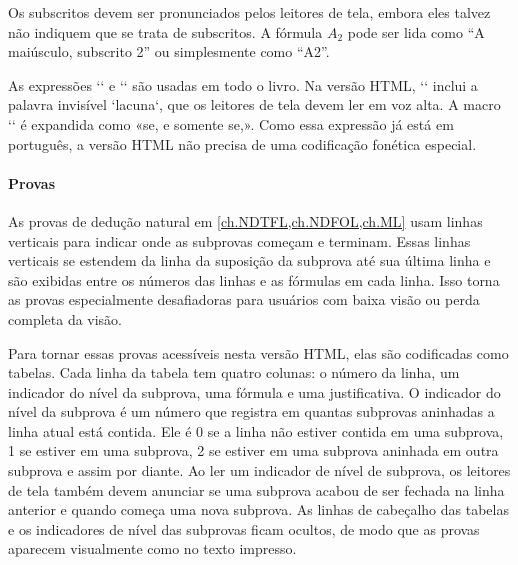 Os subscritos devem ser pronunciados pelos leitores de tela, embora eles talvez não indiquem que se trata de subscritos. A fórmula $A_2$ pode ser lida como \textquotedblleft A maiúsculo, subscrito 2\textquotedblright{} ou simplesmente como \textquotedblleft A2\textquotedblright{}.

As expressões `\blank{}` e `\ifeff` são usadas em todo o livro. Na versão HTML, `\blank{}` inclui a palavra invisível `lacuna`, que os leitores de tela devem ler em voz alta. A macro `\ifeff` é expandida como «se, e somente se,». Como essa expressão já está em português, a versão HTML não precisa de uma codificação fonética especial.

\paragraph{Provas} As provas de dedução natural em
\cref{ch.NDTFL,ch.NDFOL,ch.ML} usam linhas verticais para indicar onde as subprovas começam e terminam. Essas linhas verticais se estendem da linha da suposição da subprova até sua última linha e são exibidas entre os números das linhas e as fórmulas em cada linha. Isso torna as provas especialmente desafiadoras para usuários com baixa visão ou perda completa da visão.

Para tornar essas provas acessíveis nesta versão HTML, elas são codificadas como tabelas. Cada linha da tabela tem quatro colunas: o número da linha, um indicador do nível da subprova, uma fórmula e uma justificativa. O indicador do nível da subprova é um número que registra em quantas subprovas aninhadas a linha atual está contida. Ele é 0 se a linha não estiver contida em uma subprova, 1 se estiver em uma subprova, 2 se estiver em uma subprova aninhada em outra subprova e assim por diante. Ao ler um indicador de nível de subprova, os leitores de tela também devem anunciar se uma subprova acabou de ser fechada na linha anterior e quando começa uma nova subprova. As linhas de cabeçalho das tabelas e os indicadores de nível das subprovas ficam ocultos, de modo que as provas aparecem visualmente como no texto impresso.

